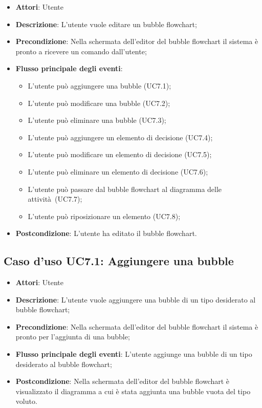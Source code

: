\documentclass[../AnalisiDeiRequisiti.tex]{subfiles}
\begin{document}
				\begin{itemize}
					\item \textbf{Attori}: Utente
					\item \textbf{Descrizione}: L'utente vuole editare un bubble flowchart;
					\item \textbf{Precondizione}: Nella schermata dell'editor del bubble flowchart il sistema è pronto a ricevere un comando dall'utente;
					\item \textbf{Flusso principale degli eventi}: \begin{itemize}
						\item L'utente può aggiungere una bubble (UC7.1);
						\item L'utente può modificare una bubble (UC7.2);
						\item L'utente può eliminare una bubble (UC7.3);
						\item L'utente può aggiungere un elemento di decisione (UC7.4);
						\item L'utente può modificare un elemento di decisione (UC7.5);
						\item L'utente può eliminare un elemento di decisione (UC7.6);
						\item L'utente può passare dal bubble flowchart al diagramma delle attività (UC7.7);
						\item L'utente può riposizionare un elemento (UC7.8);
					\end{itemize}
					\item \textbf{Postcondizione}: L'utente ha editato il bubble flowchart.
				\end{itemize}
				\subsection{Caso d'uso UC7.1: Aggiungere una bubble}
				\begin{itemize}
					\item \textbf{Attori}: Utente
					\item \textbf{Descrizione}: L'utente vuole aggiungere una bubble di un tipo desiderato al bubble flowchart;
					\item \textbf{Precondizione}: Nella schermata dell'editor del bubble flowchart il sistema è pronto per l'aggiunta di una bubble;
					\item \textbf{Flusso principale degli eventi}: L'utente aggiunge una bubble di un tipo desiderato al bubble flowchart;
					\item \textbf{Postcondizione}: Nella schermata dell'editor del bubble flowchart è visualizzato il diagramma a cui è stata aggiunta una bubble vuota del tipo voluto.
				\end{itemize}
\end{document}
